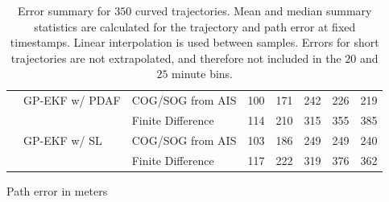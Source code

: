 \begin{table}[b]
\begin{subtable}{\textwidth}
{\begin{tabular}{lllrrrrr}
                        & GP-EKF w/ PDAF & COG/SOG from AIS  & 100 & 171 & 242  & 226  & 219  \\
                        &                & Finite Difference & 114 & 210 & 315  & 355  & 385  \\
                        & GP-EKF w/ SL   & COG/SOG from AIS  & 103 & 186 & 249  & 249  & 240  \\
                        &                & Finite Difference & 117 & 222 & 319  & 376  & 362  \\
                \bottomrule
            \end{tabular}
        }
        \caption{Path error in meters}
        \label{table:stats_curved_path_err}
    \end{subtable}
    \caption{Error summary for $350$ curved trajectories. Mean and median summary statistics are calculated for the trajectory and path error at fixed timestamps. Linear interpolation is used between samples. Errors for short trajectories are not extrapolated, and therefore not included in the $20$ and $25$ minute bins.}
    \label{table:stats_curved_error}
\end{table}


